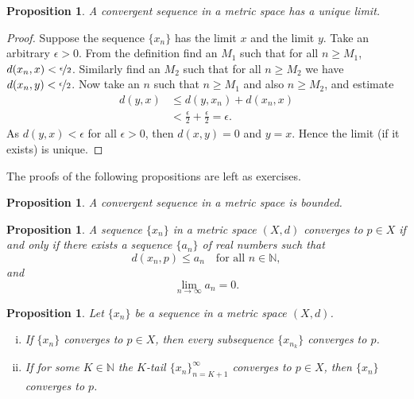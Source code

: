 \documentclass[12pt]{book}
\newcommand{\N}{{\mathbb{N}}}
\theoremstyle{plain}
\newtheorem{prop}[thm]{Proposition}
\theoremstyle{remark}
\theoremstyle{definition}
\theoremstyle{exercise}
\theoremstyle{example}
\begin{document}
\begin{prop} \label{prop:mslimisunique}
A convergent sequence in a metric space has a unique limit.
\end{prop}

\begin{proof}
Suppose the sequence $\{ x_n \}$ has the limit $x$ and the limit $y$.
Take an arbitrary $\epsilon > 0$.
From the definition find an $M_1$ such that for all $n \geq M_1$,
$d(x_n,x) < \nicefrac{\epsilon}{2}$.  Similarly find an $M_2$
such that for all $n \geq M_2$ we have
$d(x_n,y) < \nicefrac{\epsilon}{2}$.  Now take an $n$ such that
$n \geq M_1$ and also $n \geq M_2$, and estimate
\begin{equation*}
\begin{split}
d(y,x)
& \leq
d(y,x_n) + d(x_n,x) \\
& <
\frac{\epsilon}{2} + \frac{\epsilon}{2} = \epsilon .
\end{split}
\end{equation*}
As $d(y,x) < \epsilon$ for all $\epsilon > 0$, then $d(x,y) = 0$
and $y=x$.  Hence the limit (if it exists) is unique.
\end{proof}

The proofs of the following propositions are left as exercises.

\begin{prop} \label{prop:msconvbound}
A convergent sequence in a metric space is bounded.
\end{prop}

\begin{prop} \label{prop:msconvifa}
A sequence $\{ x_n \}$ in a metric space $(X,d)$ converges to $p \in X$
if and only
if there exists a sequence $\{ a_n \}$ of real numbers such that
\begin{equation*}
d(x_n,p) \leq a_n \quad \text{for all $n \in \N$},
\end{equation*}
and
\begin{equation*}
\lim_{n\to\infty} a_n = 0.
\end{equation*}
\end{prop}

\begin{prop} \label{prop:mssubseq}
Let $\{ x_n \}$ be a sequence in a metric space $(X,d)$.
\begin{enumerate}[(i)]
\item If $\{ x_n \}$ converges to $p \in X$, then every subsequence $\{ x_{n_k} \}$
converges to $p$.
\item If for some $K \in \N$ the $K$-tail $\{ x_n \}_{n=K+1}^\infty$
converges to $p \in X$, then
 $\{ x_n \}$ converges to $p$.
\end{enumerate}
\end{prop}
\end{document}
